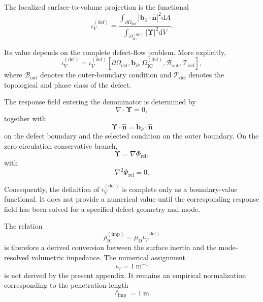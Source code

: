 The localized surface-to-volume projection is the functional
\begin{equation}
    \iota_V^{(\mathrm{def})} = \frac{ \displaystyle \int_{\partial\Omega_{\mathrm{def}}} \left| \mathbf{b}_{\partial}\cdot\hat{\mathbf{n}} \right|^2 \mathrm{d}A }{ \displaystyle \int_{\Omega_{\mathrm{IC}}^{(\mathrm{def})}} |\boldsymbol{\Upsilon}|^2 \mathrm{d}V }.
\end{equation}

Its value depends on the complete defect-flow problem. More explicitly,
\begin{equation}
    \iota_V^{(\mathrm{def})} = \iota_V^{(\mathrm{def})} \left[ \partial\Omega_{\mathrm{def}}, \mathbf{b}_{\partial}, \Omega_{\mathrm{IC}}^{(\mathrm{def})}, \mathcal{B}_{\mathrm{out}}, \mathcal{T}_{\mathrm{def}} \right],
\end{equation}
where $\mathcal{B}_{\mathrm{out}}$ denotes the outer-boundary condition and $\mathcal{T}_{\mathrm{def}}$ denotes the topological and phase class of the defect.

The response field entering the denominator is determined by
\begin{equation}
    \nabla\cdot\boldsymbol{\Upsilon} = 0,
\end{equation}
together with
\begin{equation}
    \boldsymbol{\Upsilon}\cdot\hat{\mathbf{n}} = \mathbf{b}_{\partial}\cdot\hat{\mathbf{n}}
\end{equation}
on the defect boundary and the selected condition on the outer boundary. On the zero-circulation conservative branch,
\begin{equation}
    \boldsymbol\Upsilon=\nabla\Phi_{\mathrm{rel}},
\end{equation}
with
\begin{equation}
    \nabla^2\Phi_{\mathrm{rel}}=0.
\end{equation}

Consequently, the definition of $\iota_V^{(\mathrm{def})}$ is complete only as a boundary-value functional. It does not provide a numerical value until the corresponding response field has been solved for a specified defect geometry and mode.

The relation
\begin{equation}
    \rho_{\mathrm{IC}}^{(\mathrm{imp})} = \mu_{\mathrm{D}} \iota_V^{(\mathrm{def})}
\end{equation}
is therefore a derived conversion between the surface inertia and the mode-resolved volumetric impedance. The numerical assignment
\begin{equation}
    \iota_V = 1\ \mathrm{m}^{-1}
\end{equation}
is not derived by the present appendix. It remains an empirical normalization corresponding to the penetration length
\begin{equation}
    \ell_{\mathrm{imp}} = 1\ \mathrm{m}.
\end{equation}

